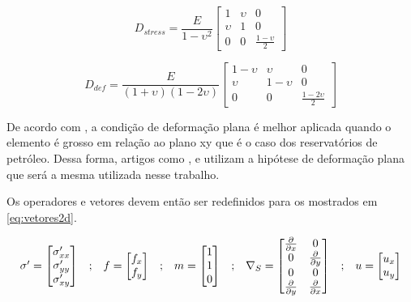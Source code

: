 \begin{equation} \label{eq:elasticplanestress}
D_{stress} = \frac{E}{1-\upsilon^2}
\begin{bmatrix}
1  & \upsilon & 0 \\ 
\upsilon & 1 &  0 \\ 
0 & 0 & \frac{1-\upsilon}{2}
\end{bmatrix}
\end{equation}

\begin{equation} \label{eq:elasticplanestrain}
D_{def} = \frac{E}{(1+\upsilon)(1-2\upsilon)}
\begin{bmatrix}
 1-\upsilon & \upsilon    &  0 \\ 
 \upsilon   &  1-\upsilon &  0 \\ 
 0& 0 & \frac{1-2\upsilon}{2}
\end{bmatrix}
\end{equation}

De acordo com \cite{jacob}, a condição de deformação plana é melhor aplicada quando o elemento é grosso em relação ao plano xy que é o caso dos reservatórios de petróleo.  Dessa forma, artigos como \cite{planeStrainProblems}, \cite{casteletto} e \cite{irina} utilizam a hipótese de deformação plana que será a mesma utilizada nesse trabalho.

Os operadores e vetores devem então ser redefinidos para os mostrados em \eqref{eq:vetores2d}.

\begin{equation}
\label{eq:vetores2d}
\begin{matrix}
\sigma^\prime = \begin{bmatrix}
\sigma^\prime_{xx}
\\
\sigma^\prime_{yy}
\\
\sigma^\prime_{xy}
\end{bmatrix}
&

;

&

f = \begin{bmatrix}
f_{x}
\\
f_{y}
\end{bmatrix}
&
;
&

m = \begin{bmatrix} 1 \\ 1 \\ 0\end{bmatrix}

&
;

&
\nabla_S = \begin{bmatrix} \frac{\partial { }}{\partial x} & 0 \\ 0 & \frac{\partial { }}{\partial y} \\ 0 & 0 \\ \frac{\partial { }}{\partial y} & \frac{\partial { }}{\partial x} \\ \end{bmatrix}

&
;

&

u = \begin{bmatrix}
u_x
\\ 
u_y
\end{bmatrix}

\end{matrix}
\end{equation}

